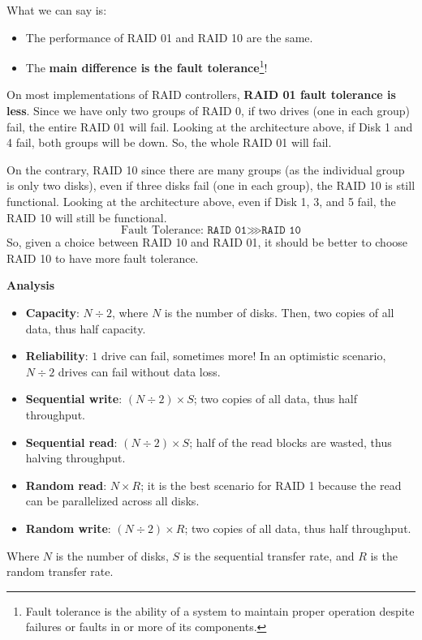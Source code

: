 \noindent
What we can say is:
\begin{itemize}
    \item The performance of RAID 01 and RAID 10 are the same.
    \item The \textbf{main difference is the fault tolerance}\footnote{Fault tolerance is the ability of a system to maintain proper operation despite failures or faults in or more of its components.}!
\end{itemize}
On most implementations of RAID controllers, \textbf{RAID 01 fault tolerance is less}. Since we have only two groups of RAID 0, if two drives (one in each group) fail, the entire RAID 01 will fail. Looking at the architecture above, if Disk 1 and 4 fail, both groups will be down. So, the whole RAID 01 will fail.

On the contrary, RAID 10 since there are many groups (as the individual group is only two disks), even if three disks fail (one in each group), the RAID 10 is still functional. Looking at the architecture above, even if Disk 1, 3, and 5 fail, the RAID 10 will still be functional.
\begin{equation*}
    \text{Fault Tolerance: } \texttt{RAID 01} \ggg \texttt{RAID 10}
\end{equation*}
So, given a choice between RAID 10 and RAID 01, it should be better to choose RAID 10 to have more fault tolerance.

\highspace
\begin{flushleft}
    \textcolor{Green3}{ \textbf{Analysis}}
\end{flushleft}
\begin{itemize}
    \item \textbf{Capacity}: $N \div 2$, where $N$ is the number of disks. Then, two copies of all data, thus half capacity.

    \item \textbf{Reliability}: $1$ drive can fail, sometimes more! In an optimistic scenario, $N \div 2$ drives can fail without data loss.

    \item \textbf{Sequential write}: $\left(N \div 2\right) \times S$; two copies of all data, thus half throughput.

    \item \textbf{Sequential read}: $\left(N \div 2\right) \times S$; half of the read blocks are wasted, thus halving throughput.

    \item \textbf{Random read}: $N \times R$; it is the best scenario for RAID 1 because the read can be parallelized across all disks.

    \item \textbf{Random write}: $\left(N \div 2\right) \times R$; two copies of all data, thus half throughput.
\end{itemize}
Where $N$ is the number of disks, $S$ is the sequential transfer rate, and $R$ is the random transfer rate.

